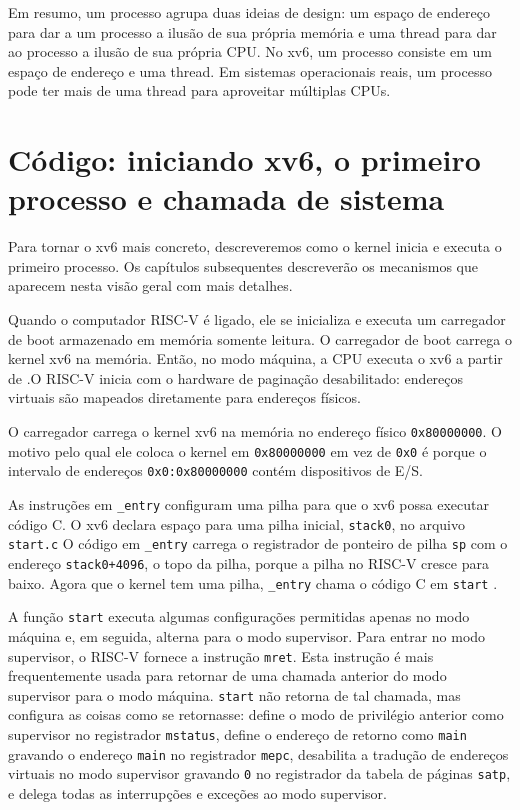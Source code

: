Em resumo, um processo agrupa duas ideias de design: um espaço de endereço para
dar a um processo a ilusão de sua própria memória e uma thread para
dar ao processo a ilusão de sua própria CPU. No xv6, um processo consiste
em um espaço de endereço e uma thread. Em sistemas operacionais reais,
um processo pode ter mais de uma thread para aproveitar múltiplas CPUs.

\section{Código: iniciando xv6, o primeiro processo e chamada de sistema}
Para tornar o xv6 mais concreto, descreveremos como o kernel inicia e
executa o primeiro processo. Os capítulos subsequentes descreverão os
mecanismos que aparecem nesta visão geral com mais detalhes.

Quando o computador RISC-V é ligado, ele se inicializa e executa um carregador de boot armazenado em memória somente leitura. O carregador de boot carrega o kernel xv6 na memória. Então, no modo máquina, a CPU executa o xv6 a partir de
.O RISC-V inicia com o hardware de paginação desabilitado:
endereços virtuais são mapeados diretamente para endereços físicos.

O carregador carrega o kernel xv6 na memória no endereço físico
\texttt{0x80000000}.
O motivo pelo qual ele coloca o kernel em
\texttt{0x80000000}
em vez de
\texttt{0x0}
é porque o intervalo de endereços
\texttt{0x0:0x80000000}
contém dispositivos de E/S.


As instruções em
\lstinline{_entry}
configuram uma pilha para que o xv6 possa executar código C.
O xv6 declara espaço para uma pilha inicial,
\lstinline{stack0},
no arquivo
\lstinline{start.c}
O código em
\lstinline{_entry}
carrega o registrador de ponteiro de pilha
\texttt{sp}
com o endereço
\lstinline{stack0+4096},
o topo da pilha, porque a pilha
no RISC-V cresce para baixo.
Agora que o kernel tem uma pilha,
\lstinline{_entry}
chama o código C em
\lstinline{start}
.

A função
\lstinline{start}
executa algumas configurações permitidas apenas no
modo máquina e, em seguida, alterna para o modo supervisor.
Para entrar no modo supervisor, o RISC-V
fornece a instrução
\lstinline{mret}.
Esta instrução é mais frequentemente usada para retornar de
uma chamada anterior do modo supervisor para o modo máquina.
\lstinline{start} não retorna de tal chamada, mas
configura as coisas como se retornasse:
define o modo de privilégio anterior como
supervisor no registrador
\lstinline{mstatus},
define o endereço de retorno como
\lstinline{main}
gravando o endereço
\lstinline{main}
no
registrador
\lstinline{mepc},
desabilita a tradução de endereços virtuais no modo supervisor
gravando
\lstinline{0}
no registrador da tabela de páginas
\lstinline{satp},
e delega todas as interrupções e exceções
ao modo supervisor.

